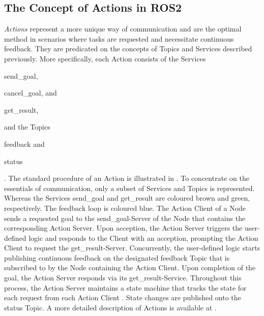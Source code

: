     \subsection{The Concept of Actions in ROS2} \label{subsec:model:actions}
        \emph{Actions} represent a more unique way of communication and are the optimal method in scenarios where tasks are requested and necessitate continuous feedback.
        They are predicated on the concepts of Topics and Services described previously. More specifically, each Action consists of the Services 
        \begin{enumerate*}[label=\Alph*)]
            \item \glqq{}send\_goal\grqq{},
            \item \glqq{}cancel\_goal\grqq{}, and
            \item \glqq{}get\_result\grqq{},
        \end{enumerate*}
        and the Topics
        \begin{enumerate*}[label=\Alph*)]
            \item \glqq{}feedback\grqq{} and
            \item \glqq{}status\grqq{}
        \end{enumerate*}.
        The standard procedure of an Action is illustrated in . To concentrate on the essentials of communication, only a subset of Services and Topics is represented. Whereas the Services \glqq{}send\_goal\grqq{} and \glqq{}get\_result\grqq{} are coloured brown and green, respectively. The feedback loop is coloured blue.\newline
        The Action Client of a Node sends a requested goal to the \glqq{}send\_goal\grqq{}-Server of the Node that contains the corresponding Action Server. Upon acception, the Action Server triggers the user-defined logic and responds to the Client with an acception, prompting the Action Client to request the \glqq{}get\_result\grqq{}-Server. Concurrently, the user-defined logic starts publishing continuous feedback on the designated feedback Topic that is subscribed to by the Node containing the Action Client. Upon completion of the goal, the Action Server responds via its \glqq{}get\_result\grqq{}-Service. \cite{website:actions}\newline
        Throughout this process, the Action Server maintains a state machine that tracks the state for each request from each Action Client \cite{website:actions}. State changes are published onto the status Topic. A more detailed description of Actions is available at \Textcite{website:actions}.

